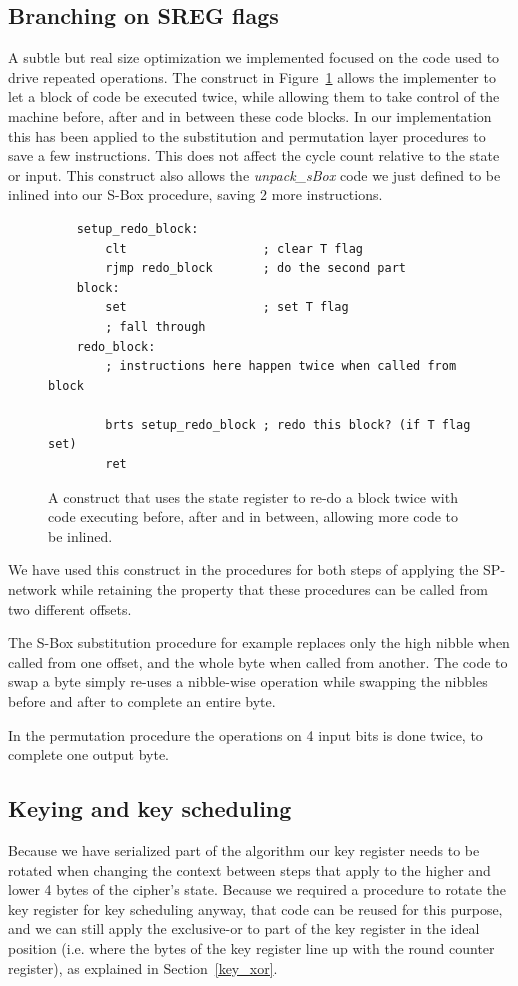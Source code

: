 \documentclass[11pt]{article}
\begin{document}
\subsection{Branching on SREG flags}
A subtle but real size optimization we implemented focused on the code used to drive repeated operations.
The construct in Figure~\ref{sreg_redo} allows the implementer to let a block of code be executed twice, while allowing them to take control of the machine before, after and in between these code blocks.
In our implementation this has been applied to the substitution and permutation layer procedures to save a few instructions.
This does not affect the cycle count relative to the state or input.
This construct also allows the \textit{unpack\_sBox} code we just defined to be inlined into our S-Box procedure, saving 2 more instructions.

\begin{figure}
	\begin{lstlisting}
	setup_redo_block:
		clt                   ; clear T flag
		rjmp redo_block       ; do the second part
	block:
		set                   ; set T flag
		; fall through
	redo_block:
		; instructions here happen twice when called from block

		brts setup_redo_block ; redo this block? (if T flag set)
		ret
	\end{lstlisting}
	\caption{\footnotesize A construct that uses the state register to re-do a block twice with code executing before, after and in between, allowing more code to be inlined.}
\label{sreg_redo}
\end{figure}

We have used this construct in the procedures for both steps of applying the SP-network while retaining the property that these procedures can be called from two different offsets.

The S-Box substitution procedure for example replaces only the high nibble when called from one offset, and the whole byte when called from another.
The code to swap a byte simply re-uses a nibble-wise operation while swapping the nibbles before and after to complete an entire byte.

In the permutation procedure the operations on 4 input bits is done twice, to complete one output byte.

\subsection{Keying and key scheduling}
Because we have serialized part of the algorithm our key register needs to be rotated when changing the context between steps that apply to the higher and lower 4 bytes of the cipher's state.
Because we required a procedure to rotate the key register for key scheduling anyway, that code can be reused for this purpose, and we can still apply the exclusive-or to part of the key register in the ideal position (i.e. where the bytes of the key register line up with the round counter register), as explained in Section~\ref{key_xor}.
\end{document}
